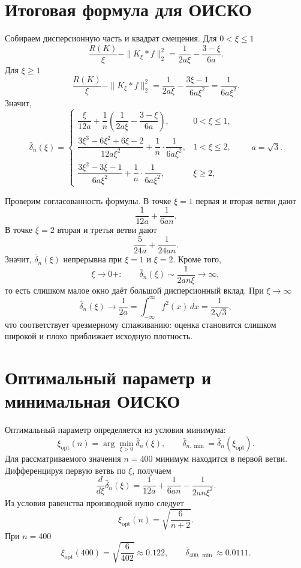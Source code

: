\section*{Итоговая формула для ОИСКО}

Собираем дисперсионную часть и квадрат смещения. Для $0<\xi\le 1$
\[
\frac{R(K)}{\xi}-\|K_\xi*f\|_2^2
=\frac{1}{2a\xi}-\frac{3-\xi}{6a}.
\]
Для $\xi\ge 1$
\[
\frac{R(K)}{\xi}-\|K_\xi*f\|_2^2
=\frac{1}{2a\xi}-\frac{3\xi-1}{6a\xi^2}
=\frac{1}{6a\xi^2}.
\]
Значит,
\[
\bar{\delta}_n(\xi)=
\begin{cases}
\dfrac{\xi}{12a}
+
\dfrac{1}{n}\left(\dfrac{1}{2a\xi}-\dfrac{3-\xi}{6a}\right),
& 0<\xi\le 1,\\[10pt]
\dfrac{3\xi^3-6\xi^2+6\xi-2}{12a\xi^2}
+
\dfrac{1}{n}\cdot\dfrac{1}{6a\xi^2},
& 1<\xi\le 2,\\[10pt]
\dfrac{3\xi^2-3\xi-1}{6a\xi^2}
+
\dfrac{1}{n}\cdot\dfrac{1}{6a\xi^2},
& \xi\ge 2,
\end{cases}
\qquad a=\sqrt{3}.
\]

Проверим согласованность формулы. В точке $\xi=1$ первая и вторая ветви
дают
\[
\frac{1}{12a}+\frac{1}{6an}.
\]
В точке $\xi=2$ вторая и третья ветви дают
\[
\frac{5}{24a}+\frac{1}{24an}.
\]
Значит, $\bar{\delta}_n(\xi)$ непрерывна при $\xi=1$ и $\xi=2$.
Кроме того,
\[
\xi\to 0+:\qquad
\bar{\delta}_n(\xi)\sim \frac{1}{2an\xi}\to\infty,
\]
то есть слишком малое окно даёт большой дисперсионный вклад. При
$\xi\to\infty$
\[
\bar{\delta}_n(\xi)\to\frac{1}{2a}
=\int_{-\infty}^{\infty}f^2(x)\,dx
=\frac{1}{2\sqrt{3}},
\]
что соответствует чрезмерному сглаживанию: оценка становится слишком
широкой и плохо приближает исходную плотность.

\section*{Оптимальный параметр и минимальная ОИСКО}

Оптимальный параметр определяется из условия минимума:
\[
\xi_{\mathrm{opt}}(n)=\arg\min_{\xi>0}\bar{\delta}_n(\xi),
\qquad
\bar{\delta}_{n,\min}=\bar{\delta}_n(\xi_{\mathrm{opt}}).
\]
Для рассматриваемого значения $n=400$ минимум находится в первой ветви.
Дифференцируя первую ветвь по $\xi$, получаем
\[
\frac{d}{d\xi}\bar{\delta}_n(\xi)
=\frac{1}{12a}+\frac{1}{6an}
-\frac{1}{2an\xi^2}.
\]
Из условия равенства производной нулю следует
\[
\xi_{\mathrm{opt}}(n)=\sqrt{\frac{6}{n+2}}.
\]
При $n=400$
\[
\xi_{\mathrm{opt}}(400)=\sqrt{\frac{6}{402}}\approx 0.122,
\qquad
\bar{\delta}_{400,\min}\approx 0.0111.
\]

